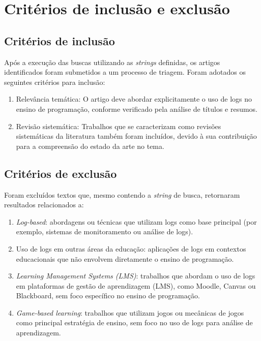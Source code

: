 \section{Critérios de inclusão e exclusão}\label{sec:msl-criterios}

\subsection{Critérios de inclusão}\label{subsec:criterios-inclusao}

Após a execução das buscas utilizando as \textit{strings} definidas, os artigos identificados foram submetidos a um processo de triagem. Foram adotados os seguintes critérios para inclusão:

\begin{enumerate}
    \item Relevância temática: O artigo deve abordar explicitamente o uso de logs no ensino de programação, conforme verificado pela análise de títulos e resumos.
    \item Revisão sistemática: Trabalhos que se caracterizam como revisões sistemáticas da literatura também foram incluídos, devido à sua contribuição para a compreensão do estado da arte no tema.
\end{enumerate}

\subsection{Critérios de exclusão}\label{subsec:criterios-exclusao}

Foram excluídos textos que, mesmo contendo a \textit{string} de busca, retornaram resultados relacionados a:

\begin{enumerate}
    \item \textit{Log-based}: abordagens ou técnicas que utilizam logs como base principal (por exemplo, sistemas de monitoramento ou análise de logs).
    \item Uso de logs em outras áreas da educação: aplicações de logs em contextos educacionais que não envolvem diretamente o ensino de programação.
    \item \textit{Learning Management Systems (LMS)}: trabalhos que abordam o uso de logs em plataformas de gestão de aprendizagem (LMS), como Moodle, Canvas ou Blackboard, sem foco específico no ensino de programação.
    \item \textit{Game-based learning}: trabalhos que utilizam jogos ou mecânicas de jogos como principal estratégia de ensino, sem foco no uso de logs para análise de aprendizagem.
\end{enumerate}

